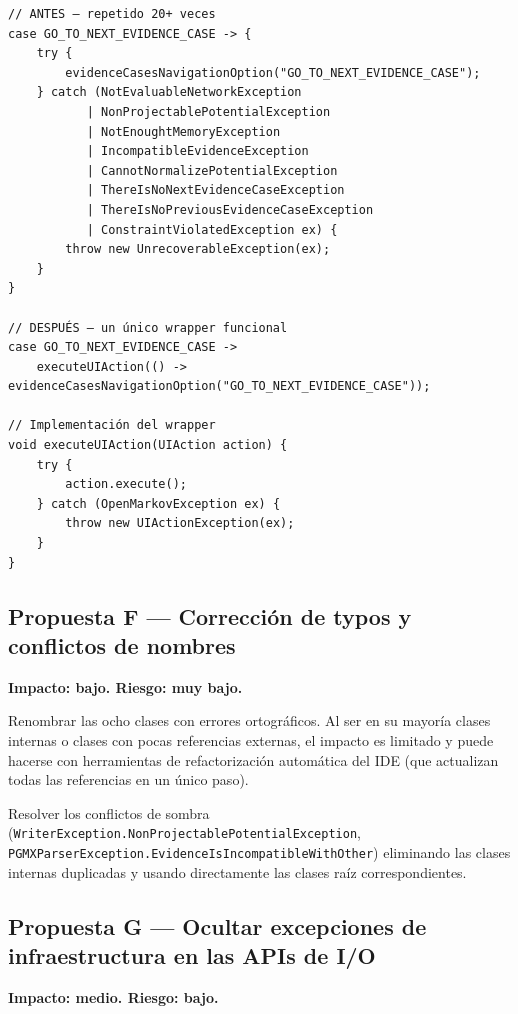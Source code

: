 \documentclass[11pt,a4paper]{article}
\newcommand{\jdot}{.\discretionary{}{}{}}
\begin{document}
\begin{lstlisting}[caption={Simplificación de los bloques \texttt{catch} de la GUI con \texttt{UIActionException}},label={lst:ui-action}]
// ANTES — repetido 20+ veces
case GO_TO_NEXT_EVIDENCE_CASE -> {
    try {
        evidenceCasesNavigationOption("GO_TO_NEXT_EVIDENCE_CASE");
    } catch (NotEvaluableNetworkException
           | NonProjectablePotentialException
           | NotEnoughtMemoryException
           | IncompatibleEvidenceException
           | CannotNormalizePotentialException
           | ThereIsNoNextEvidenceCaseException
           | ThereIsNoPreviousEvidenceCaseException
           | ConstraintViolatedException ex) {
        throw new UnrecoverableException(ex);
    }
}

// DESPUÉS — un único wrapper funcional
case GO_TO_NEXT_EVIDENCE_CASE ->
    executeUIAction(() -> evidenceCasesNavigationOption("GO_TO_NEXT_EVIDENCE_CASE"));

// Implementación del wrapper
void executeUIAction(UIAction action) {
    try {
        action.execute();
    } catch (OpenMarkovException ex) {
        throw new UIActionException(ex);
    }
}
\end{lstlisting}

\subsection{Propuesta F — Corrección de typos y conflictos de nombres}

\textbf{Impacto: bajo. Riesgo: muy bajo.}

Renombrar las ocho clases con errores ortográficos. Al ser en su mayoría clases internas o
clases con pocas referencias externas, el impacto es limitado y puede hacerse con herramientas
de refactorización automática del IDE (que actualizan todas las referencias en un único paso).

Resolver los conflictos de sombra (\texttt{WriterException\jdot NonProjectablePotentialException},
\texttt{PGMXParserException\jdot EvidenceIsIncompatibleWithOther}) eliminando las clases internas
duplicadas y usando directamente las clases raíz correspondientes.

\subsection{Propuesta G — Ocultar excepciones de infraestructura en las APIs de I/O}

\textbf{Impacto: medio. Riesgo: bajo.}
\end{document}

